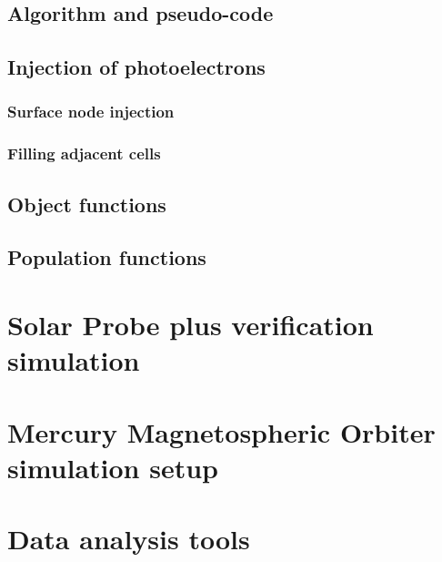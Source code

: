 \subsection{Algorithm and pseudo-code}


\subsection{Injection of photoelectrons}
\subsubsection{Surface node injection}
\subsubsection{Filling adjacent cells}

\subsection{Object functions}
\subsection{Population functions}

\section{Solar Probe plus verification simulation}

\section{Mercury Magnetospheric Orbiter simulation setup}

\section{Data analysis tools}
